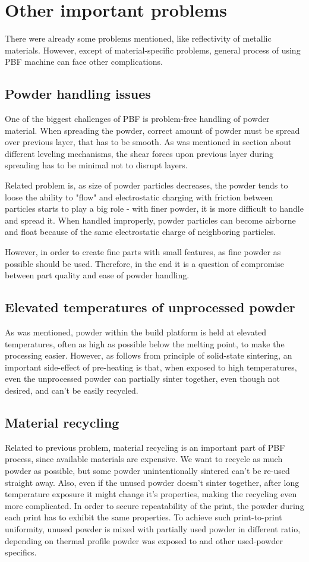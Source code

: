 \documentclass[a4paper, 11pt, reqno]{report}
\begin{document}
\section{Other important problems}
There were already some problems mentioned, like reflectivity of metallic materials. However, except of material-specific problems, general process of using PBF machine can face other complications.
\subsection{Powder handling issues}
One of the biggest challenges of PBF is problem-free handling of powder material. When spreading the powder, correct amount of powder must be spread over previous layer, that has to be smooth. As was mentioned in section about different leveling mechanisms, the shear forces upon previous layer during spreading has to be minimal not to disrupt layers.

	Related problem is, as size of powder particles decreases, the powder tends to loose the ability to "flow" and electrostatic charging with friction between particles starts to play a big role - with finer powder, it is more difficult to handle and spread it. When handled improperly, powder particles can become airborne and float because of the same electrostatic charge of neighboring particles.
	
	However, in order to create fine parts with small features, as fine powder as possible should be used. Therefore, in the end it is a question of compromise between part quality and ease of powder handling.
\subsection{Elevated temperatures of unprocessed powder}
As was mentioned, powder within the build platform is held at elevated temperatures, often as high as possible below the melting point, to make the processing easier. However, as follows from principle of solid-state sintering, an important side-effect of pre-heating is that, when exposed to high temperatures, even the unprocessed powder can partially sinter together, even though not desired, and can't be easily recycled.
\subsection{Material recycling}
Related to previous problem, material recycling is an important part of PBF process, since available materials are expensive. We want to recycle as much powder as possible, but some powder unintentionally sintered can't be re-used straight away. Also, even if the unused powder doesn't sinter together, after long temperature exposure it might change it's properties, making the recycling even more complicated. In order to secure repeatability of the print, the powder during each print has to exhibit the same properties. To achieve such print-to-print uniformity, unused powder is mixed with partially used powder in different ratio, depending on thermal profile powder was exposed to and other used-powder specifics.
\end{document}
